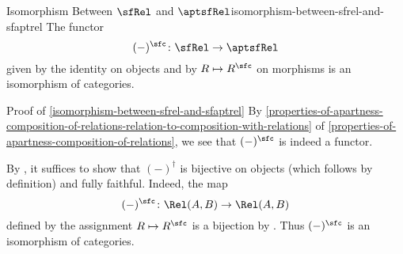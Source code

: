 \begin{proposition}{Isomorphism Between $\sfRel$ and $\aptsfRel$}{isomorphism-between-sfrel-and-sfaptrel}%
    The functor
    \[
        (-)^{\sfc}%
        \colon%
        \sfRel%
        \to%
        \aptsfRel%
    \]%
    given by the identity on objects and by $R\mapsto R^{\sfc}$ on morphisms is an isomorphism of categories.
\end{proposition}
\begin{Proof}{Proof of \cref{isomorphism-between-sfrel-and-sfaptrel}}%
    By \cref{properties-of-apartness-composition-of-relations-relation-to-composition-with-relations} of \cref{properties-of-apartness-composition-of-relations}, we see that $(-)^{\sfc}$ is indeed a functor.

    \indent By , it suffices to show that $(-)^{\dagger}$ is bijective on objects (which follows by definition) and fully faithful. Indeed, the map
    \[
        (-)^{\sfc}%
        \colon%
        \Rel(A,B)%
        \to%
        \Rel(A,B)%
    \]%
    defined by the assignment $R\mapsto R^{\sfc}$ is a bijection by . Thus $(-)^{\sfc}$ is an isomorphism of categories.
\end{Proof}
